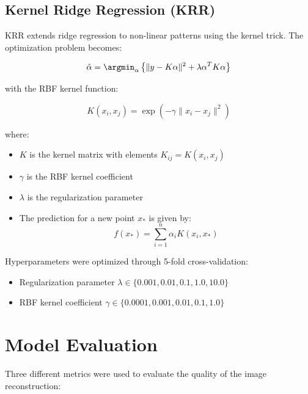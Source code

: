 \documentclass{article}
\begin{document}
        \subsection{Kernel Ridge Regression (KRR)}
        KRR extends ridge regression to non-linear patterns using the kernel trick. The optimization problem becomes:
        
        \begin{equation}
            \hat{\alpha} = \argmin_{\alpha} \left\{ \|y - K\alpha\|^2 + \lambda\alpha^T K\alpha \right\}
        \end{equation}
        
        with the RBF kernel function:
        
        \begin{equation}
            K(x_i, x_j) = \exp\left(-\gamma\|x_i - x_j\|^2\right)
        \end{equation}
        
        where:
        \begin{itemize}
            \item $K$ is the kernel matrix with elements $K_{ij} = K(x_i, x_j)$
            \item $\gamma$ is the RBF kernel coefficient
            \item $\lambda$ is the regularization parameter
            \item The prediction for a new point $x_*$ is given by:
            \begin{equation}
                f(x_*) = \sum_{i=1}^n \alpha_i K(x_i, x_*)
            \end{equation}
        \end{itemize}
        
        Hyperparameters were optimized through 5-fold cross-validation:
        \begin{itemize}
            \item Regularization parameter $\lambda \in \{0.001, 0.01, 0.1, 1.0, 10.0\}$
            \item RBF kernel coefficient $\gamma \in \{0.0001, 0.001, 0.01, 0.1, 1.0\}$
        \end{itemize}
    
    \section{Model Evaluation}
    Three different metrics were used to evaluate the quality of the image reconstruction:
    
\end{document}
